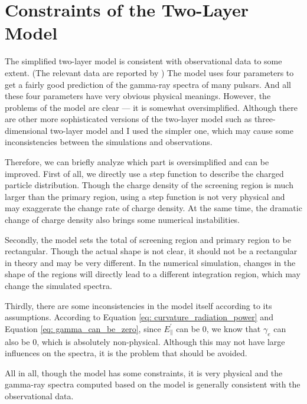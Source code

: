 \documentclass[a4paper, 12pt]{report}
\begin{document}
  \section{Constraints of the Two-Layer Model} 
    The simplified two-layer model is consistent with observational data to some extent. 
    (The relevant data are reported by \cite{0004-637X-720-1-178})
    The model uses four parameters to get a fairly good prediction of the gamma-ray 
    spectra of many pulsars. And all these four parameters have very obvious physical 
    meanings. However, the problems of the model are clear --- it is somewhat 
    oversimplified. Although there are other more sophisticated versions of the 
    two-layer model such as three-dimensional two-layer model 
    \cite{doi:10.1111/j.1365-2966.2011.18577.x} and I used the simpler 
    one, which may cause some inconsistencies between the simulations and observations. 

    Therefore, we can briefly analyze which part is oversimplified and can be improved. 
    First of all, we directly use a step function to describe the charged particle 
    distribution. Though the charge density of the screening region is much larger than 
    the primary region, using a step function is not very physical and may exaggerate 
    the change rate of charge density. At the same time, the dramatic change of charge 
    density also brings some numerical instabilities.

    Secondly, the model sets the total of screening region and primary region to be 
    rectangular. Though the actual shape is not clear, it should not be a 
    rectangular in theory and may be very different. In the numerical simulation, changes 
    in the shape of the regions will directly lead to a different integration region, 
    which may change the simulated spectra.
  
    Thirdly, there are some inconsistencies in the model itself according to its 
    assumptions. According to Equation \ref{eq: curvature_radiation_power} and Equation 
    \ref{eq: gamma_can_be_zero}, since $E_{\parallel}^{\prime}$ can be $0$, we know that 
    $\gamma_{e}$ can also be $0$, which is absolutely non-physical. Although this may not 
    have large influences on the spectra, it is the problem that should be avoided.

    All in all, though the model has some constraints, it is very physical and the gamma-ray 
    spectra computed based on the model is generally consistent with the observational data.
\end{document}
